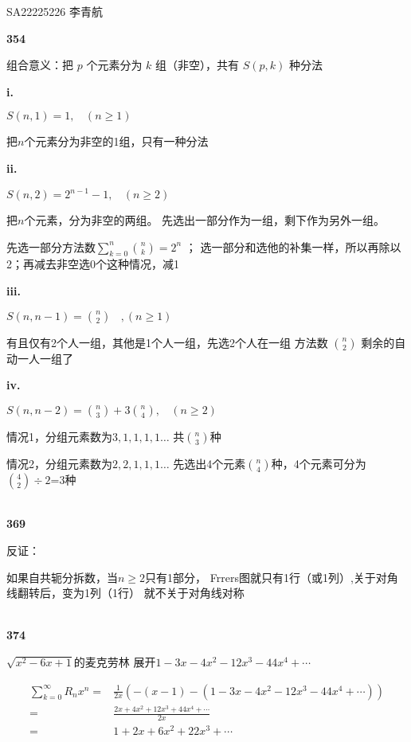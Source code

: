\documentclass[UTF8]{ctexart}
\begin{document}
    SA22225226 李青航

    \noindent\textbf{354}

    组合意义：把 $p$ 个元素分为 $k$ 组（非空），共有 $S(p,k)$ 种分法

    \textbf{i. }
    
    $S(n, 1) = 1,~~~~(n \ge 1)$

    把$n$个元素分为非空的1组，只有一种分法

    \textbf{ii. }
    
    $S(n, 2) = 2^{n-1} - 1,~~~~(n \ge 2)$

    把$n$个元素，分为非空的两组。
    先选出一部分作为一组，剩下作为另外一组。

    先选一部分方法数$\sum^{n}_{k=0}{n\choose k}=2^n$ ；
    选一部分和选他的补集一样，所以再除以2；再减去非空选0个这种情况，减1

    \textbf{iii. }

    $S(n, n - 1) = {n\choose 2}~~~~, (n\ge 1)$

    有且仅有2个人一组，其他是1个人一组，先选2个人在一组
    方法数 ${n\choose 2}$ 剩余的自动一人一组了

    \textbf{iv. }

    $S(n, n - 2) = {n\choose 3}+3{n\choose 4},~~~~(n\ge 2)$

    情况1，分组元素数为$3, 1, 1, 1, 1\dots$
    共$n \choose 3$种

    情况2，分组元素数为$2,2,1,1,1\dots$
    先选出4个元素$n\choose 4$种，4个元素可分为${4\choose 2} \div 2$=3种

    ~\\
    \noindent\textbf{369}

    反证：
    
    如果自共轭分拆数，当$n\ge 2$只有1部分，
    Frrers图就只有1行（或1列）,关于对角线翻转后，变为1列（1行）
    就不关于对角线对称

    ~\\
    \noindent\textbf{374}

    $\sqrt{x^2-6x+1}$的麦克劳林 展开$1-3x-4x^2-12x^3-44x^4+\cdots$

    \begin{equation*}
        \begin{aligned}
            \sum_{k=0}^{\infty} R_n x^n =& \frac{1}{2x} (-(x-1) - (1-3x-4x^2-12x^3-44x^4 + \cdots)) \\
            =& \frac{2x+4x^2+ 12x^3 + 44x^4 + \cdots}{2x} \\
            =& 1 + 2x + 6x^2 + 22 x^3 + \cdots
            \end{aligned}
    \end{equation*}
\end{document}
